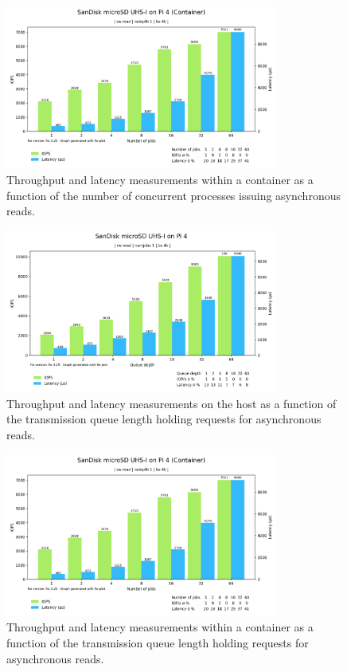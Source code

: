 \begin{figure}[H]
    \centering
    \includegraphics[width=0.8\textwidth]{images/results/sandisk-libaio-read-numjobs-iops-latency.png}
    \caption{Throughput and latency measurements within a container as a function of the number of concurrent processes issuing asynchronous reads.}
    \label{images:fundamentals/net-ns-veth-arch.jpg}
\end{figure}

\begin{figure}[H]
    \centering
    \includegraphics[width=0.8\textwidth]{images/results/sandisk-host-libaio-read-queue-depth-iops-latency.png}
    \caption{Throughput and latency measurements on the host as a function of the transmission queue length holding requests for asynchronous reads.}
    \label{images:fundamentals/net-ns-veth-arch.jpg}
\end{figure}

\begin{figure}[H]
    \centering
    \includegraphics[width=0.8\textwidth]{images/results/sandisk-libaio-read-numjobs-iops-latency.png}
    \caption{Throughput and latency measurements within a container as a function of the transmission queue length holding requests for asynchronous reads.}
    \label{images:fundamentals/net-ns-veth-arch.jpg}
\end{figure}

